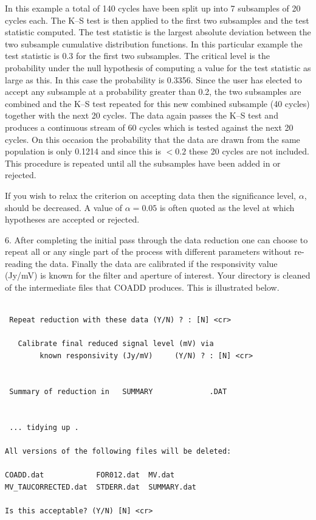 \documentclass{article}
\begin{document}
In this example a total of 140 cycles have been split up into 7 subsamples of
20 cycles each. The K--S test is then applied to the first two subsamples
and the test statistic computed. The test statistic is the largest absolute
deviation between the two subsample cumulative distribution functions. In this
particular example the test statistic is 0.3 for the first two subsamples.
The critical level is the probability under the null hypothesis of computing a
value for the test statistic as large as this. In this case the probability
is 0.3356. Since the user has elected to accept any subsample at a probability
greater than 0.2, the two subsamples are combined and the K--S test repeated
for this new combined subsample (40 cycles) together with the next 20 cycles.
The data again passes the K--S test and produces a continuous stream of 60
cycles which is tested against the next 20 cycles. On this occasion the
probability that the data are drawn from the same population is only 0.1214
and since this is $< 0.2$ these 20 cycles are not included.
This procedure is repeated until all the subsamples have been added
in or rejected.

If you wish  to relax the criterion on accepting data then the significance
level, $\alpha$, should be decreased. A value of $\alpha = 0.05$ is often
quoted as the level at which hypotheses are accepted or rejected.

6. After completing the initial pass through the data reduction one can choose
to repeat all or any single part of the process with different parameters
without re-reading the data. Finally the data are calibrated if the
responsivity value (Jy/mV) is known for the filter and aperture of interest.
Your directory is cleaned of the intermediate files that COADD produces.
This is illustrated below.

\begin{verbatim}

 Repeat reduction with these data (Y/N) ? : [N] <cr>

   Calibrate final reduced signal level (mV) via
        known responsivity (Jy/mV)     (Y/N) ? : [N] <cr>


 Summary of reduction in   SUMMARY             .DAT


 ... tidying up .

All versions of the following files will be deleted:

COADD.dat            FOR012.dat  MV.dat
MV_TAUCORRECTED.dat  STDERR.dat  SUMMARY.dat

Is this acceptable? (Y/N) [N] <cr>


\end{verbatim}
\end{document}
